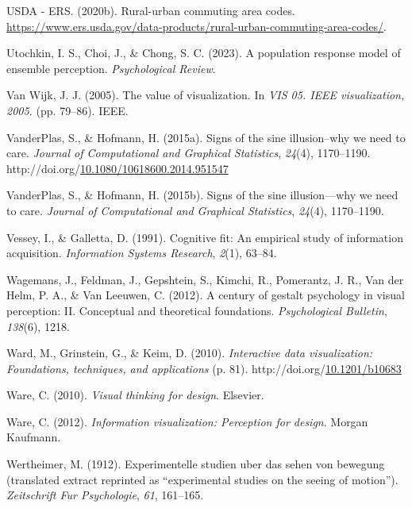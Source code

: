\documentclass[print]{nuthesis}
\newlength{\cslhangindent}
\newenvironment{CSLReferences}[2]%
{\setlength{\parindent}{0pt}%
\everypar{\setlength{\hangindent}{\cslhangindent}}\ignorespaces}%
{\par}
\begin{document}
\begin{CSLReferences}{1}{0}
\leavevmode{}%
USDA - ERS. (2020b). Rural-urban commuting area codes. \url{https://www.ers.usda.gov/data-products/rural-urban-commuting-area-codes/}.

\leavevmode{}%
Utochkin, I. S., Choi, J., \& Chong, S. C. (2023). A population response model of ensemble perception. \emph{Psychological Review}.

\leavevmode{}%
Van Wijk, J. J. (2005). The value of visualization. In \emph{VIS 05. IEEE visualization, 2005.} (pp. 79--86). IEEE.

\leavevmode{}%
VanderPlas, S., \& Hofmann, H. (2015a). Signs of the sine illusion--why we need to care. \emph{Journal of Computational and Graphical Statistics}, \emph{24}(4), 1170--1190. http://doi.org/\href{https://doi.org/10.1080/10618600.2014.951547}{10.1080/10618600.2014.951547}

\leavevmode{}%
VanderPlas, S., \& Hofmann, H. (2015b). Signs of the sine illusion---why we need to care. \emph{Journal of Computational and Graphical Statistics}, \emph{24}(4), 1170--1190.

\leavevmode{}%
Vessey, I., \& Galletta, D. (1991). Cognitive fit: An empirical study of information acquisition. \emph{Information Systems Research}, \emph{2}(1), 63--84.

\leavevmode{}%
Wagemans, J., Feldman, J., Gepshtein, S., Kimchi, R., Pomerantz, J. R., Van der Helm, P. A., \& Van Leeuwen, C. (2012). A century of gestalt psychology in visual perception: II. Conceptual and theoretical foundations. \emph{Psychological Bulletin}, \emph{138}(6), 1218.

\leavevmode{}%
Ward, M., Grinstein, G., \& Keim, D. (2010). \emph{Interactive data visualization: Foundations, techniques, and applications} (p. 81). http://doi.org/\href{https://doi.org/10.1201/b10683}{10.1201/b10683}

\leavevmode{}%
Ware, C. (2010). \emph{Visual thinking for design}. Elsevier.

\leavevmode{}%
Ware, C. (2012). \emph{Information visualization: Perception for design}. Morgan Kaufmann.

\leavevmode{}%
Wertheimer, M. (1912). Experimentelle studien uber das sehen von bewegung (translated extract reprinted as {``experimental studies on the seeing of motion''}). \emph{Zeitschrift Fur Psychologie}, \emph{61}, 161--165.


\end{CSLReferences}
\end{document}
